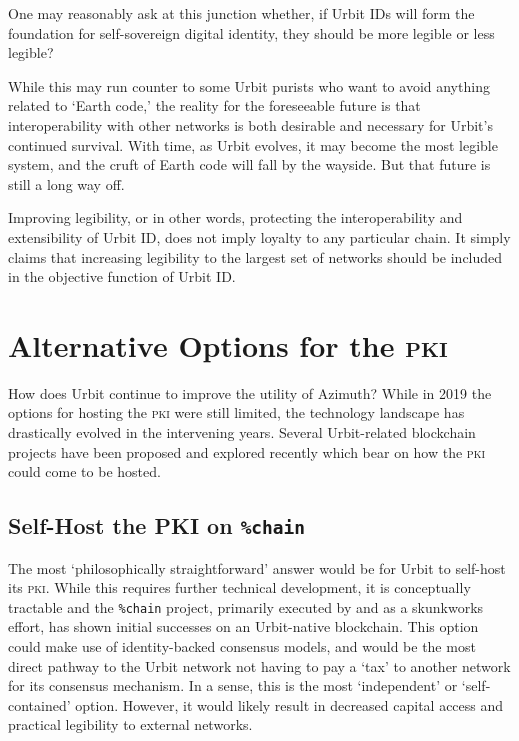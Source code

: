 \documentclass[twoside]{article}
\begin{document}
One may reasonably ask at this junction whether, if Urbit IDs will form the foundation for self-sovereign digital identity, they should be more legible or less legible?

While this may run counter to some Urbit purists who want to avoid anything related to `Earth code,' the reality for the foreseeable future is that interoperability with other networks is both desirable and necessary for Urbit's continued survival. With time, as Urbit evolves, it may become the most legible system, and the cruft of Earth code will fall by the wayside. But that future is still a long way off.

Improving legibility, or in other words, protecting the interoperability and extensibility of Urbit ID, does not imply loyalty to any particular chain. It simply claims that increasing legibility to the largest set of networks should be included in the objective function of Urbit ID.

\section{Alternative Options for the \textsc{pki}}

How does Urbit continue to improve the utility of Azimuth? While in 2019 the options for hosting the \textsc{pki} were still limited, the technology landscape has drastically evolved in the intervening years.  Several Urbit-related blockchain projects have been proposed and explored recently which bear on how the \textsc{pki} could come to be hosted.

\subsection[Self-Host the \textsc{pki} on \texttt{\%chain}]{Self-Host the PKI on \texttt{\%chain}}

The most `philosophically straightforward' answer would be for Urbit to self-host its \textsc{pki}. While this requires further technical development, it is conceptually tractable and the \lstinline[style=inlinecode]{%chain} project, primarily executed by  and  as a skunkworks effort, has shown initial successes on an Urbit-native blockchain. This option could make use of identity-backed consensus models, and would be the most direct pathway to the Urbit network not having to pay a `tax' to another network for its consensus mechanism. In a sense, this is the most `independent' or `self-contained' option. However, it would likely result in decreased capital access and practical legibility to external networks.
\end{document}
